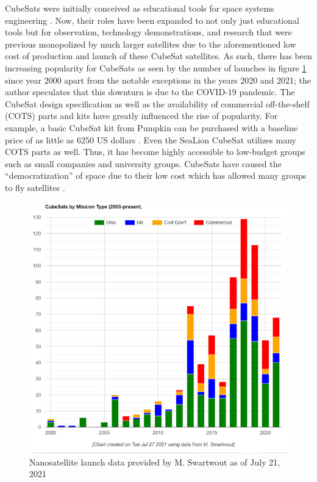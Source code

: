 \documentclass[journal,article,submit,pdftex,moreauthors]{Definitions/mdpi}
\begin{document}
CubeSats were initially conceived as educational tools for space systems engineering \cite{heidt_new}.  Now, their roles have been expanded to not only just educational tools but for observation, technology demonstrations, and research that were previous monopolized by much larger satellites due to the aforementioned low cost of production and launch of these CubeSat satellites.  As such, there has been increasing popularity for CubeSats as seen by the number of launches in figure \ref{fig:launch_data} since year 2000 \cite{swartwout_data} apart from the notable exceptions in the years 2020 and 2021; the author speculates that this downturn is due to the COVID-19 pandemic.  The CubeSat design specification \cite{cds_rev14} as well as the availability of commercial off-the-shelf (COTS) parts and kits have greatly influenced the rise of popularity.  For example, a basic CubeSat kit from Pumpkin can be purchased with a baseline price of as little as 6250 US dollars \cite{pumpkin_cubesat}.  Even the SeaLion CubeSat utilizes many COTS parts as well.  Thus, it has become highly accessible to low-budget groups such as small companies and university groups.  CubeSats have caused the “democratization” of space due to their low cost which has allowed many groups to fly satellites \cite{cubesat_handbook}.  

\begin{figure}[H]
    \includegraphics[width=10.5 cm]{assets/launch_data.png}
    \caption{Nanosatellite launch data provided by M. Swartwout as of July 21, 2021 \cite{swartwout_data}}
	\label{fig:launch_data}
    \end{figure}
	\noindent   
\unskip
\end{document}
